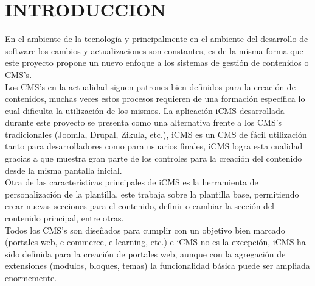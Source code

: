 
\chapter{INTRODUCCION}
\newpage

En el ambiente de la tecnolog\'ia y principalmente en el ambiente del desarrollo de software los cambios y actualizaciones son constantes, es de la misma forma que este proyecto propone un nuevo enfoque a los sistemas de gesti\'on de contenidos o CMS's.\\
Los CMS's en la actualidad siguen patrones bien definidos para la creaci\'on de contenidos, muchas veces estos procesos requieren de una formaci\'on espec\'ifica lo cual dificulta la utilizaci\'on de los mismos. La aplicaci\'on iCMS desarrollada durante este proyecto se presenta como una alternativa frente a los CMS's tradicionales (Joomla, Drupal, Zikula, etc.), iCMS es un CMS de f\'acil utilizaci\'on tanto para desarrolladores como para usuarios finales, iCMS logra esta cualidad gracias a que muestra gran parte de los controles para la creaci\'on del contenido desde la misma pantalla inicial.\\
Otra de las caracter\'isticas principales de iCMS es la herramienta de personalizaci\'on de la plantilla, este trabaja sobre la plantilla base, permitiendo crear nuevas secciones para el contenido, definir o cambiar la secci\'on del contenido principal, entre otras.\\
Todos los CMS's son dise\~nados para cumplir con un objetivo bien marcado (portales web, e-commerce, e-learning, etc.) e iCMS no es la excepci\'on, iCMS ha sido definida para la creaci\'on de portales web, aunque con la agregaci\'on de extensiones (modulos, bloques, temas) la funcionalidad b\'asica puede ser ampliada enormemente.

%
\clearpage

